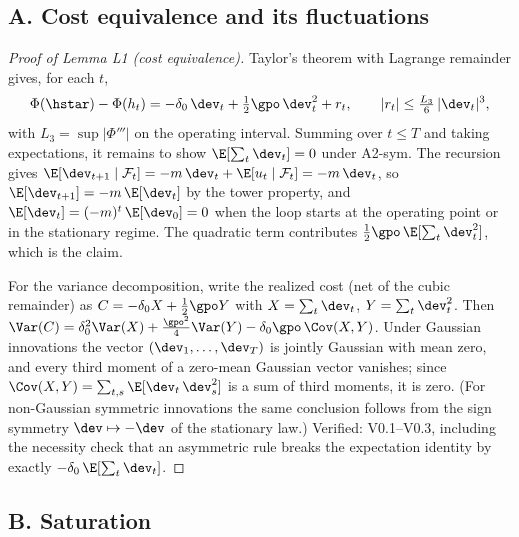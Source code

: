 
\subsection*{A. Cost equivalence and its fluctuations}

\begin{proof}[Proof of Lemma L1 (cost equivalence)]
Taylor's theorem with Lagrange remainder gives, for each $t$,
\[
\Phi(\hstar) - \Phi(h_t)
 = -\delta_0\,\dev_t + \tfrac{1}{2}\gpo\,\dev_t^2 + r_t,
 \qquad |r_t| \le \tfrac{L_3}{6}\,|\dev_t|^3,
\]
with $L_3 = \sup |\Phi'''|$ on the operating interval. Summing over
$t \le T$ and taking expectations, it remains to show
$\E[\sum_t \dev_t] = 0$ under A2-sym. The recursion gives
$\E[\dev_{t+1} \mid \mathcal{F}_t] = -m\,\dev_t + \E[u_t \mid \mathcal{F}_t]
= -m\,\dev_t$, so $\E[\dev_{t+1}] = -m\,\E[\dev_t]$ by the tower property,
and $\E[\dev_t] = (-m)^t\,\E[\dev_0] = 0$ when the loop starts at the
operating point or in the stationary regime. The quadratic term contributes
$\tfrac{1}{2}\gpo\,\E[\sum_t \dev_t^2]$, which is the claim.

For the variance decomposition, write the realized cost (net of the cubic
remainder) as $C = -\delta_0 X + \tfrac{1}{2}\gpo Y$ with
$X = \sum_t \dev_t$, $Y = \sum_t \dev_t^2$. Then
$\Var(C) = \delta_0^2 \Var(X) + \tfrac{\gpo^2}{4}\Var(Y)
- \delta_0\gpo\,\Cov(X, Y)$. Under Gaussian innovations the vector
$(\dev_1,\dots,\dev_T)$ is jointly Gaussian with mean zero, and every third
moment of a zero-mean Gaussian vector vanishes; since
$\Cov(X,Y) = \sum_{t,s}\E[\dev_t\,\dev_s^2]$ is a sum of third moments, it is
zero. (For non-Gaussian symmetric innovations the same conclusion follows
from the sign symmetry $\dev \mapsto -\dev$ of the stationary law.)
Verified: V0.1--V0.3, including the necessity check that an asymmetric rule
breaks the expectation identity by exactly $-\delta_0\,\E[\sum_t \dev_t]$.
\end{proof}

\subsection*{B. Saturation}

